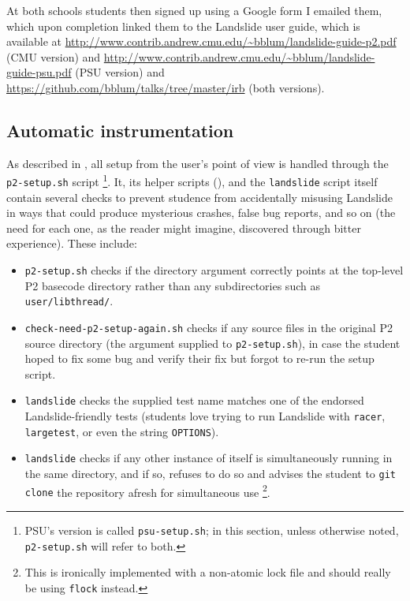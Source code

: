 At both schools students then signed up using a Google form I emailed them,
which upon completion linked them to the Landslide user guide,
which is available at
\url{http://www.contrib.andrew.cmu.edu/~bblum/landslide-guide-p2.pdf}
(CMU version)
and
\url{http://www.contrib.andrew.cmu.edu/~bblum/landslide-guide-psu.pdf}
(PSU version)
and
\url{https://github.com/bblum/talks/tree/master/irb}
(both versions).

\subsection{Automatic instrumentation}
\label{sec:education-pebbles-instrumentation}

As described in \sect{\ref{sec:landslide-setup}},
all setup from the user's point of view is handled through the {\tt p2-setup.sh} script%
\footnote{PSU's version is called {\tt psu-setup.sh};
in this section, unless otherwise noted, {\tt p2-setup.sh} will refer to both.
}.
It, its helper scripts (\sect{\ref{sec:landslide-glue}}),
and the {\tt landslide} script itself contain several checks to prevent
studence
from accidentally misusing Landslide in ways that could produce mysterious crashes, false bug reports, and so on
(the need for each one, as the reader might imagine, discovered through bitter experience).
These include:
\begin{itemize}
	\item {\tt p2-setup.sh} checks if the directory argument correctly points at the top-level P2 basecode directory
		rather than any subdirectories such as {\tt user/libthread/}.
	\item {\tt check-need-p2-setup-again.sh} checks if any source files in the original P2 source directory
		(the argument supplied to {\tt p2-setup.sh}),
		in case the student hoped to fix some bug and verify their fix but forgot to re-run the setup script.
	\item {\tt landslide} checks the supplied test name matches one of the endorsed Landslide-friendly tests
		(students love trying to run Landslide with {\tt racer}, {\tt largetest},
		or even the string {\tt OPTIONS}).
	\item {\tt landslide} checks if any other instance of itself is simultaneously running in the same directory,
		and if so, refuses to do so and advises the student
		to {\tt git clone} the repository afresh for simultaneous use%
		\footnote{This is ironically implemented with a non-atomic lock file
		and should really be using {\tt flock} instead.
		}.
\end{itemize}
\vspace{1em}


